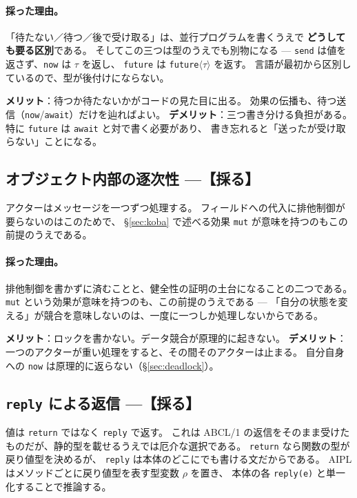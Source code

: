 \documentclass[11pt,a4paper]{ltjsarticle}
\theoremstyle{definition}
\theoremstyle{remark}
\begin{document}
\paragraph{採った理由。}
「待たない／待つ／後で受け取る」は、並行プログラムを書くうえで
\textbf{どうしても要る区別}である。
そしてこの三つは型のうえでも別物になる ---
\texttt{send} は値を返さず、\texttt{now} は $\tau$ を返し、
\texttt{future} は \texttt{future}$\langle\tau\rangle$ を返す。
言語が最初から区別しているので、型が後付けにならない。

\textbf{メリット}：待つか待たないかがコードの見た目に出る。
効果の伝播も、待つ送信（\texttt{now}/\texttt{await}）だけを辿ればよい。
\textbf{デメリット}：三つ書き分ける負担がある。
特に \texttt{future} は \texttt{await} と対で書く必要があり、
書き忘れると「送ったが受け取らない」ことになる。

\subsection{オブジェクト内部の逐次性 ---【採る】}


アクターはメッセージを一つずつ処理する。
フィールドへの代入に排他制御が要らないのはこのためで、
\S\ref{sec:koba} で述べる効果 \texttt{mut} が意味を持つのもこの前提のうえである。

\paragraph{採った理由。}
排他制御を書かずに済むことと、健全性の証明の土台になることの二つである。
\texttt{mut} という効果が意味を持つのも、この前提のうえである ---
「自分の状態を変える」が競合を意味しないのは、一度に一つしか処理しないからである。

\textbf{メリット}：ロックを書かない。データ競合が原理的に起きない。
\textbf{デメリット}：一つのアクターが重い処理をすると、その間そのアクターは止まる。
自分自身への \texttt{now} は原理的に返らない（\S\ref{sec:deadlock}）。

\subsection{\texttt{reply} による返信 ---【採る】}


値は \texttt{return} ではなく \texttt{reply} で返す。
これは ABCL/1 の返信をそのまま受けたものだが、静的型を載せるうえでは厄介な選択である。
\texttt{return} なら関数の型が戻り値型を決めるが、
\texttt{reply} は本体のどこにでも書ける文だからである。
AIPL はメソッドごとに戻り値型を表す型変数 $\rho$ を置き、
本体の各 \texttt{reply(e)} と単一化することで推論する。
\end{document}
